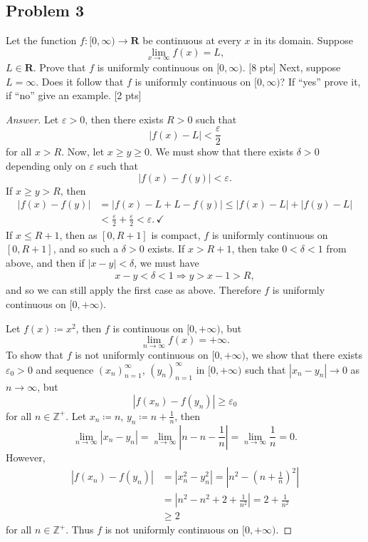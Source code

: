 \documentclass[12pt]{article}
\newcommand{\z}{\mathbb{Z}}
\newcommand\paren[1]{\left( #1 \right)}
\newcommand{\abs}[1]{\left | #1 \right |}
\newcommand{\eps}{\varepsilon}
\theoremstyle{definition}
\begin{document}
\subsection{Problem 3 \texorpdfstring{\cite{PZ}}{}}
Let the function $f : [0,\infty) \to \mathbf{R}$ be continuous at every $x$ in its domain. Suppose 
\[
    \lim\limits_{x \to \infty} f(x) = L , 
\]
$L \in \mathbf{R}$. Prove that $f$ is uniformly continuous on $[0,\infty)$. [8 pts] Next, suppose $L = \infty$. Does it follow that $f$ is uniformly continuous on $[0,\infty)$? If ``yes'' prove it, if ``no'' give an example. [2 pts]
\begin{proof}[Answer]
    Let $\eps > 0$, then there exists $R > 0$ such that 
    \[
        \abs{ f(x) - L } < \frac{\eps}{2} 
    \]
    for all $x > R$. Now, let $x \geq y \geq 0$. We must show that there exists $\delta > 0$ depending only on $\eps$ such that 
    \[
        \abs{ f(x) - f(y) } < \eps . 
    \]
    If $x \geq y > R$, then 
    \begin{align*}
        \abs{ f(x) - f(y) } & = \abs{ f(x) - L + L - f(y) } \leq \abs{ f(x) - L } + \abs{ f(y) - L } \\ 
        & < \frac{\eps}{2} + \frac{\eps}{2} < \eps . \, \checkmark 
    \end{align*}
    If $x \leq R+1$, then as $[0,R+1]$ is compact, $f$ is uniformly continuous on $[0,R+1]$, and so such a $\delta > 0$ exists. If $x > R + 1$, then take $0 < \delta < 1$ from above, and then if $\abs{x - y} < \delta$, we must have 
    \begin{align*}
        x - y < \delta < 1 \Rightarrow y > x - 1 > R ,
    \end{align*}
    and so we can still apply the first case as above. Therefore $f$ is uniformly continuous on $[0,+\infty)$. 
    
    Let $f(x) \coloneqq x^2$, then $f$ is continuous on $[0,+\infty)$, but 
    \[
        \lim\limits_{n \to \infty} f(x) = +\infty . 
    \]
    To show that $f$ is not uniformly continuous on $[0,+\infty)$, we show that there exists $\eps_0 > 0$ and sequence $\paren{ x_n }_{n = 1}^{\infty}$, $\paren{ y_n }_{n = 1}^{\infty}$ in $[0,+\infty)$ such that $\abs{ x_n - y_n } \to 0$ as $n \to \infty$, but 
    \[
        \abs{ f \paren{ x_n } - f \paren{ y_n } } \geq \eps_0 
    \]
    for all $n \in \z^+$. Let $x_n \coloneqq n$, $y_n \coloneqq n + \frac{1}{n}$, then 
    \[
        \lim\limits_{n \to \infty} \abs{ x_n - y_n } = \lim\limits_{n \to \infty} \abs{ n - n - \frac{1}{n} } = \lim\limits_{n \to \infty} \frac{1}{n} = 0 . 
    \] 
    However, 
    \begin{align*}
        \abs{ f \paren{ x_n } - f \paren{ y_n } } & = \abs{ x_n^2 - y_n^2 } = \abs{ {n^2} - \paren{ n + \frac{1}{n} }^2 } \\ 
        & = \abs{ n^2 - n^2 + 2 + \frac{1}{n^2} } = 2 + \frac{1}{n^2} \\ 
        & \geq 2 
    \end{align*}
    for all $n \in \z^+$. Thus $f$ is not uniformly continuous on $[0,+\infty)$. 
\end{proof}
\end{document}
